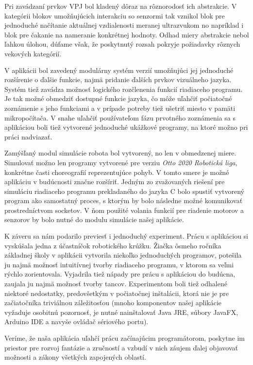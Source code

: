 Pri zavádzaní prvkov VPJ bol kladený dôraz na rôznorodosť ich abstrakcie. V kategórii blokov umožňujúcich interakciu so senzormi tak vznikol blok pre jednoduché načítanie aktuálnej vzdialenosti meranej ultrazvukom no napríklad i blok pre čakanie na nameranie konkrétnej hodnoty. Odhad miery abstrakcie nebol ľahkou úlohou, dúfame však, že poskytnutý rozsah pokryje požiadavky rôznych vekových kategórií.

V aplikácii bol zavedený modulárny systém verzií umožňujúci jej jednoduché rozšírenie o ďalšie funkcie, najmä pridanie ďalších prvkov vizuálneho jazyka. Systém tiež zavádza možnosť logického rozčlenenia funkcií riadiaceho programu. Je tak možné obmedziť dostupné funkcie jazyka, čo môže uľahčiť počiatočné zoznámenie s jeho funkciami a v prípade potreby tiež ušetriť miesto v pamäti mikropočítača. V snahe uľahčiť používateľom fázu prvotného zoznámenia sa s aplikáciou boli tiež vytvorené jednoduché ukážkové programy, na ktoré možno pri práci nadviazať.

Zamýšľaný modul simulácie robota bol vytvorený, no len v obmedzenej miere. Simulovať možno len programy vytvorené pre verziu \textit{Otto 2020 Robotická liga}, konkrétne časti choreografií reprezentujúce pohyb. V tomto smere je možné aplikáciu v budúcnosti značne rozšíriť. Jedným zo zvažovaných riešení pre simuláciu riadiaceho programu prekladaného do jazyka C bolo spustiť vytvorený program ako samostatný proces, s ktorým by bolo následne možné komunikovať prostredníctvom socketov. V ňom použité volania funkcií pre riadenie motorov a senzorov by bolo nutné  do modulu simulácie našej aplikácie.

K záveru sa nám podarilo previesť i jednoduchý experiment. Prácu s aplikáciou si vyskúšala jedna z účastníčok robotického krúžku. Žiačka ôsmeho ročníka základnej školy v aplikácii vytvorila niekoľko jednoduchých programov, potešila ju najmä možnosť intuitívnej tvorby riadiaceho programu, v ktorom sa veľmi rýchlo zorientovala. Vyjadrila tiež nápady pre prácu s aplikáciou do budúcna, zaujala ju najmä možnosť tvorby tancov. Experimentom boli tiež odhalené niektoré nedostatky, predovšetkým v počiatočnej inštalácii, ktorá nie je pre začiatočníka triviálnou záležitosťou (mnoho komponentov našej aplikácie vyžaduje osobitnú pozornosť, je nutné nainštalovať Java JRE, súbory JavaFX, Arduino IDE a navyše ovládač sériového portu).

Veríme, že naša aplikácia uľahčí prácu začínajúcim programátorom, poskytne im priestor pre rozvoj fantázie a zručností a vzbudí v nich záujem ďalej objavovať možnosti a zákony všetkých zapojených oblastí.